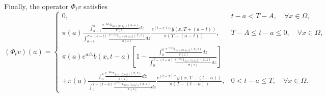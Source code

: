 \documentclass[10pt, a4]{amsart}
\makeatletter
\theoremstyle{plain}
\theoremstyle{definition}
\theoremstyle{remark}
\renewenvironment{proof}[1][\proofname]{\par
  \pushQED{\qed}%
  \normalfont \topsep6\p@\@plus6\p@\relax
  \trivlist
  \item[\hskip\labelsep
        \itshape
    #1\ \ref{#1}.]\ignorespaces
}{%
  \popQED\endtrivlist\@endpefalse
}
\numberwithin{equation}{section}
\makeatother
\begin{document}
\begin{proof}[of Proposition \ref{pr2.3}]
Finally, the operator \(\Phi_t v\) satisfies  
\begin{equation}
(\Phi_t v)(a) =
\begin{cases}
0, & t-a<T-A, \quad \forall x \in \Omega, \\
\pi(a) \frac{\int_{a-t}^{a} \frac{e^{-z\triangle} \mathds{1}_{\lbrace\omega\times[0,a_0]\rbrace}(x,z)}{\pi(z)} dz}{\int_{a-t}^{T+(a-t)} \frac{e^{-z\triangle} \mathds{1}_{\lbrace\omega\times[0,a_0]\rbrace}(x,z)}{\pi(z)} dz} \frac{e^{(t-T)\triangle} \bar{y}(x,T+(a-t))}{\pi(T+(a-t))}, & T-A \leq t-a \leq 0, \quad \forall x \in \Omega, \\
\pi(a)e^{a\triangle}b(x,t-a) \left[1 - \frac{\int_{0}^{a} \frac{e^{-z\triangle} \mathds{1}_{\lbrace\omega\times[0,a_0]\rbrace}(x,z)}{\pi(z)} dz}{\int_{0}^{T-(t-a)} \frac{e^{-z\triangle} \mathds{1}_{\lbrace\omega\times[0,a_0]\rbrace}(x,z)}{\pi(z)} dz} \right] \\
+ \pi(a) \frac{\int_{0}^{a} \frac{e^{-z\triangle} \mathds{1}_{\lbrace\omega\times[0,a_0]\rbrace}(x,z)}{\pi(z)} dz}{\int_{0}^{T-(t-a)} \frac{e^{-z\triangle} \mathds{1}_{\lbrace\omega\times[0,a_0]\rbrace}(x,z)}{\pi(z)} dz} \frac{e^{(t-T)\triangle} \bar{y}(x,T-(t-a))}{\pi(T-(t-a))}, & 0 < t-a \leq T, \quad \forall x \in \Omega.
\end{cases}
\end{equation}  
\end{proof}
\end{document}
